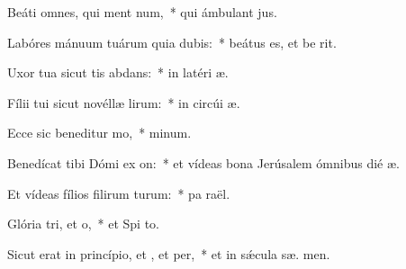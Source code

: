 \item Beáti omnes, qui ment num,~* qui ámbulant   jus.
\item Labóres mánuum tuárum quia dubis:~* beátus es, et be  rit.
\item Uxor tua sicut tis abdans:~* in latéri  æ.
\item Fílii tui sicut novéllæ lirum:~* in circúi  æ.
\item Ecce sic beneditur mo,~*   minum.
\item Benedícat tibi Dómi ex on:~* et vídeas bona Jerúsalem ómnibus dié  æ.
\item Et vídeas fílios filirum turum:~* pa  raël.
\item Glória tri, et o,~* et Spi to.
\item Sicut erat in princípio, et , et per,~* et in sǽcula sæ. men.
